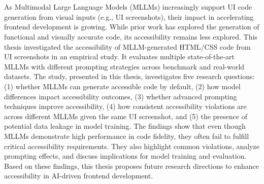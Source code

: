\chapter{\abstractname}


As Multimodal Large Language Models (MLLMs) increasingly support 
UI code generation from visual inputs (e.g., UI screenshots), their impact 
in accelerating frontend development is growing. While prior work 
has explored the generation of functional and visually accurate code,
its accessibility remains less explored. This thesis 
investigated the accessibility of MLLM-generated HTML/CSS code from 
UI screenshots in an empirical study. It evaluates multiple 
state-of-the-art MLLMs with different prompting strategies 
across benchmark and real-world datasets. The study, presented 
in this thesis, investigates 
five research questions: (1) whether MLLMs can generate accessible 
code by default, (2) how model differences impact accessibility 
outcomes, (3) whether advanced prompting techniques improve 
accessibility, (4) how consistent accessibility 
violations are across different MLLMs given the same UI 
screenshot, and (5) the presence of potential data leakage
in model training. The findings show that even though MLLMs demonstrate 
high performance in code fidelity, they often fail to fulfill 
critical accessibility requirements. They also highlight common violations,
analyze prompting effects, and discuss implications for model training
and evaluation. Based on these findings, this thesis proposes future research
directions to enhance accessibility in AI-driven frontend development.